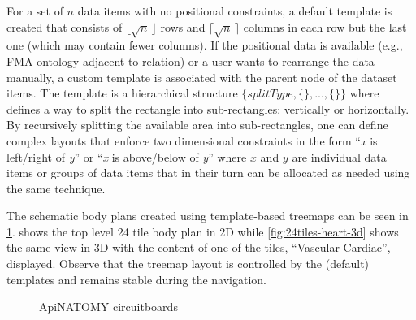 For a set of $n$ data items with no positional constraints, a default template is created that consists of $\lfloor \sqrt{n}\, \rfloor$ rows and $\lceil \sqrt{n}\, \rceil$ columns in each row but the last one (which may contain fewer columns). If the positional data is available (e.g., FMA ontology adjacent-to relation) or a user wants to rearrange the data manually, a custom template is associated with the parent node of the dataset items. The template is a hierarchical structure
$\{splitType, \{\},..., \{\}\}$ where  defines a way to split the rectangle into sub-rectangles: vertically or horizontally. By recursively splitting the available area into sub-rectangles, one can define complex layouts that enforce two dimensional constraints in the form ``\emph{x} is left/right of \emph{y}'' or ``\emph{x} is above/below of \emph{y}'' where $x$ and $y$ are individual data items or groups of data items that in their turn can be allocated as needed using the same technique.

The schematic body plans created using template-based treemaps can be seen in \cref{fig:treemaps}.  shows the top level 24 tile body plan in 2D while \cref{fig:24tiles-heart-3d} shows the same view in 3D with the content of one of the tiles, ``Vascular Cardiac'', displayed. Observe that the treemap layout is controlled by the (default) templates and remains stable during the navigation.

\begin{figure}%
  \centering%
  \caption{ApiNATOMY circuitboards}
  \label{fig:treemaps}
\end{figure}


